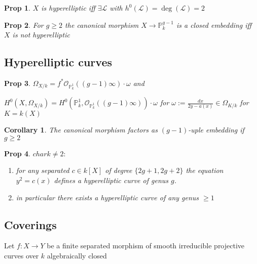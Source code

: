 \documentclass[a4paper, 12pt]{article}
\newcommand{\ca}[1]{\mathcal{#1}}
\newcommand{\cl}{\mathcal{L}}
\newcommand{\bbp}{\mathbb{P}}
\newtheorem*{prop}{Prop}
\newtheorem*{cor}{Corollary}
\begin{document}
	\begin{prop}
		$ X $ is hyperelliptic iff $ \exists \cl $ with $ h^0(\cl) = \deg(\cl) = 2 $
	\end{prop}

	\begin{prop}
		For $ g \ge 2 $ the canonical morphism $ X \rightarrow \bbp^{g-1}_k $ is a closed embedding iff $ X $ is not hyperelliptic
	\end{prop}
	
	\subsection{Hyperelliptic curves}
	
	\begin{prop}
		$ \Omega_{X/k} = f^*\ca{O}_{\bbp^1_k}((g-1)\infty)\cdot \omega $ and
		
		$ H^0(X,\Omega_{X/k}) = H^0(\bbp^1_k , \ca{O}_{\bbp^1_k}((g-1)\infty))\cdot \omega $ for $ \omega := \frac{dx}{2y-a(x)} \in \Omega_{K/k} $ for $ K = k(X) $
	\end{prop}
	
	\begin{cor}
		The canonical morphism factors as $ (g-1) $-uple embedding if $ g \ge 2 $
	\end{cor}
	
	\begin{prop}
		$ char k \ne 2 : $
		\begin{enumerate}
			\item for any separated $ c \in k[X] $ of degree $ \{ 2g + 1 , 2g + 2 \} $ the equation $ y^2 = c(x) $ defines a hyperelliptic curve of genus $ g $.
			\item in particular there exists a hyperelliptic curve of any genus $ \ge 1 $
		\end{enumerate}
	\end{prop}
	
	
	
	\subsection{Coverings}
	
	Let $ f:X \rightarrow Y  $ be a finite separated morphism of smooth irreducible projective curves over $ k $ algebraically closed
	
\end{document}
